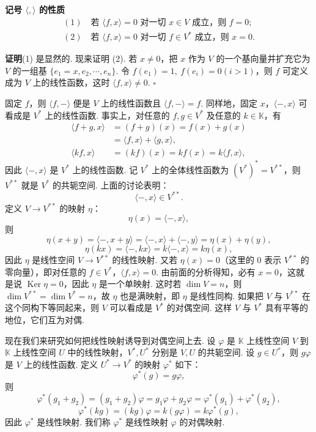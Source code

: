 \documentclass[UTF8, 12pt, fontset=fandol, oneside]{ctexart}
\begin{document}
\noindent\textbf{记号 $\langle,\rangle$ 的性质}
\[
\begin{gathered}
  (1)\quad \text{若 }\langle f,x\rangle=0\text{ 对一切 }x\in V\text{ 成立，则 }f=0;\\
  (2)\quad \text{若 }\langle f,x\rangle=0\text{ 对一切 }f\in V^*\text{ 成立，则 }x=0.
\end{gathered}
\]

\noindent\textbf{证明}\quad (1) 是显然的. 现来证明 (2). 若 $x\ne0$，把 $x$ 作为 $V$ 的一个基向量并扩充它为 $V$ 的一组基 $\{e_1=x,e_2,\cdots,e_n\}$. 令 $f(e_1)=1,\ f(e_i)=0(i>1)$，则 $f$ 可定义成为 $V$ 上的线性函数，这时 $\langle f,x\rangle\ne0$. $\square$

固定 $f$，则 $\langle f,-\rangle$ 便是 $V$ 上的线性函数且 $\langle f,-\rangle=f$. 同样地，固定 $x$，$\langle-,x\rangle$ 可看成是 $V^*$ 上的线性函数. 事实上，对任意的 $f,g\in V^*$ 及任意的 $k\in\mathbb K$，有
\[
\begin{aligned}
  \langle f+g,x\rangle&=(f+g)(x)=f(x)+g(x)\\
  &=\langle f,x\rangle+\langle g,x\rangle,\\
  \langle kf,x\rangle&=(kf)(x)=kf(x)=k\langle f,x\rangle,
\end{aligned}
\]
因此 $\langle-,x\rangle$ 是 $V^*$ 上的线性函数. 记 $V^*$ 上的全体线性函数为 $(V^*)^*=V^{**}$，则 $V^{**}$ 就是 $V^*$ 的共轭空间. 上面的讨论表明：
\[
  \langle-,x\rangle\in V^{**}.
\]
定义 $V\to V^{**}$ 的映射 $\eta$：
\[
  \eta(x)=\langle-,x\rangle,
\]
则
\[
  \eta(x+y)=\langle-,x+y\rangle=\langle-,x\rangle+\langle-,y\rangle=\eta(x)+\eta(y),
\]
\[
  \eta(kx)=\langle-,kx\rangle=k\langle-,x\rangle=k\eta(x),
\]
因此 $\eta$ 是线性空间 $V\to V^{**}$ 的线性映射. 又若 $\eta(x)=0$（这里的 0 表示 $V^{**}$ 的零向量），即对任意的 $f\in V^*$，$\langle f,x\rangle=0$. 由前面的分析得知，必有 $x=0$，这就是说 $\operatorname{Ker}\eta=0$，因此 $\eta$ 是一个单映射. 这时若 $\dim V=n$，则 $\dim V^{**}=\dim V^*=n$，故 $\eta$ 也是满映射，即 $\eta$ 是线性同构. 如果把 $V$ 与 $V^{**}$ 在这个同构下等同起来，则 $V$ 可以看成是 $V^*$ 的对偶空间. 这样 $V$ 与 $V^*$ 具有平等的地位，它们互为对偶.

现在我们来研究如何把线性映射诱导到对偶空间上去. 设 $\varphi$ 是 $\mathbb K$ 上线性空间 $V$ 到 $\mathbb K$ 上线性空间 $U$ 中的线性映射，$V^*,U^*$ 分别是 $V,U$ 的共轭空间. 设 $g\in U^*$，则 $g\varphi$ 是 $V$ 上的线性函数. 定义 $U^*\to V^*$ 的映射 $\varphi^*$ 如下：
\[
  \varphi^*(g)=g\varphi,
\]
则
\[
  \varphi^*(g_1+g_2)=(g_1+g_2)\varphi=g_1\varphi+g_2\varphi=\varphi^*(g_1)+\varphi^*(g_2),
\]
\[
  \varphi^*(kg)=(kg)\varphi=k(g\varphi)=k\varphi^*(g),
\]
因此 $\varphi^*$ 是线性映射. 我们称 $\varphi^*$ 是线性映射 $\varphi$ 的对偶映射.
\end{document}
